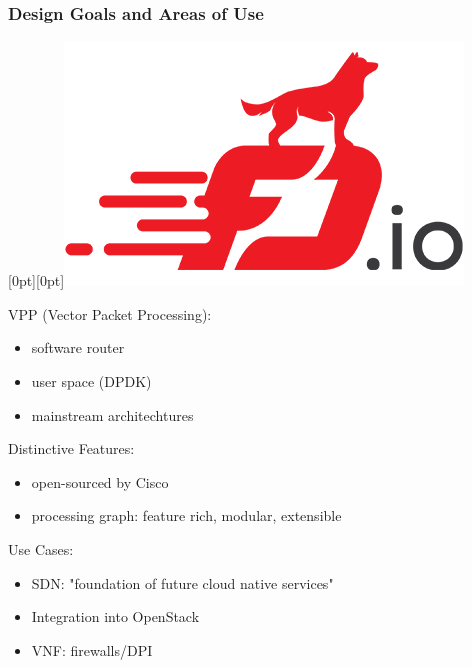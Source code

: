 \begin{frame}
    \frametitle{Design Goals and Areas of Use}
    


    \mbox{}\hfill\raisebox{-\height}[0pt][0pt]{\includegraphics[width=.15\linewidth]{pics/logo_fdio.png}}

    VPP (Vector Packet Processing): 
    \begin{itemize}
        \item software router
        \item user space (DPDK)
        \item mainstream architechtures
    \end{itemize}
    \pause

    Distinctive Features: %
    \begin{itemize}
        \item open-sourced by Cisco \cite{vppwiki:whatis}
        \item processing graph: feature rich, modular, extensible \cite{linguaglossa2017high}
    \end{itemize}
    \pause

    Use Cases:
    \begin{itemize}
        \item SDN: "foundation of future cloud native services" \cite{florincoras}
        \item Integration into OpenStack \cite{fdio:integration}
        \item VNF: firewalls/DPI \cite{qosmos}\cite{cisco:sdn}
    \end{itemize}

\end{frame}

